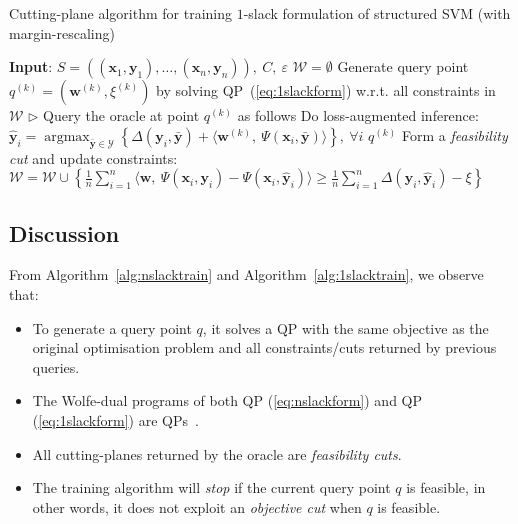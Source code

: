 \documentclass[9pt]{extarticle}
\DeclareMathOperator*{\argmax}{argmax}
\begin{document}
\begin{algorithm}[htbp]
\caption{Cutting-plane algorithm for training $1$-slack formulation of structured SVM (with margin-rescaling)}
\label{alg:1slacktrain}
\begin{algorithmic}[1]
\STATE \textbf{Input}: $S = \left( (\mathbf{x}_1, \mathbf{y}_1), \dots, (\mathbf{x}_n, \mathbf{y}_n) \right),~ C,~ \varepsilon$
\STATE $\mathcal{W} = \emptyset$
{}
    \STATE Generate query point $q^{(k)} = (\mathbf{w}^{(k)}, \xi^{(k)})$ by solving QP~(\ref{eq:1slackform}) w.r.t. all constraints in $\mathcal{W}$
    \STATE $\triangleright$ Query the oracle at point $q^{(k)}$ as follows
    \STATE Do loss-augmented inference:~
           $\hat{\mathbf{y}}_i = \argmax_{\bar{\mathbf{y}} \in \mathcal{Y}} \left\{ \Delta(\mathbf{y}_i, \bar{\mathbf{y}}) + 
            \langle \mathbf{w}^{(k)},~ \Psi(\mathbf{x}_i, \bar{\mathbf{y}}) \rangle \right\},~ \forall i$
        \RETURN $q^{(k)}$
    \ELSE
        \STATE Form a \emph{feasibility cut} and update constraints:~
               $\mathcal{W} = \mathcal{W} \cup \left\{ 
                \frac{1}{n} \sum_{i=1}^n \langle \mathbf{w},~ \Psi(\mathbf{x}_i, \mathbf{y}_i) - \Psi(\mathbf{x}_i, \hat{\mathbf{y}}_i) \rangle \ge 
                \frac{1}{n} \sum_{i=1}^n \Delta(\mathbf{y}_i, \hat{\mathbf{y}}_i) - \xi \right\}$
    \ENDIF
\ENDFOR
\end{algorithmic}
\end{algorithm}


\subsection{Discussion}
\label{sec:ssvm_discussion}

From Algorithm~\ref{alg:nslacktrain} and Algorithm~\ref{alg:1slacktrain}, we observe that:
\begin{itemize}
\item To generate a query point $q$, it solves a QP with the same objective as the original optimisation problem and
      all constraints/cuts returned by previous queries. 
\item The Wolfe-dual programs of both QP (\ref{eq:nslackform}) and QP (\ref{eq:1slackform}) are QPs~\cite{tsochantaridis2005large,joachims2009cutting}.
\item All cutting-planes returned by the oracle are \emph{feasibility cuts}.
\item The training algorithm will \emph{stop} if the current query point $q$ is feasible, 
      in other words, it does not exploit an \emph{objective cut} when $q$ is feasible. 
\end{itemize}
\end{document}

